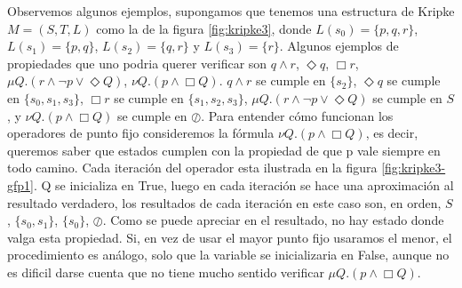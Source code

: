 Observemos algunos ejemplos, supongamos que tenemos una estructura de Kripke $M = (S,T,L)$ como la de la figura \ref{fig:kripke3}, donde $L(s_{0}) = \{p,q,r\}$, $L(s_{1}) = \{p,q\}$, $L(s_{2}) = \{q,r\}$ y $L(s_{3}) = \{r\}$. Algunos ejemplos de propiedades que uno podria querer verificar son $q \land r$, $\Diamond q$, $\Box r$, $\mu Q. (r \land \neg p \lor \Diamond Q)$, $\nu Q. (p \land \Box Q)$. $q \land r$ se cumple en $\{s_{2}\}$, $\Diamond q$ se cumple en $\{s_{0},s_{1},s_{3}\}$, $\Box r$ se cumple en $\{s_{1},s_{2},s_{3}\}$, $\mu Q. (r \land \neg p \lor \Diamond Q)$ se cumple en $S$, y $\nu Q. (p \land \Box Q)$ se cumple en $\oslash$. Para entender cómo funcionan los operadores de punto fijo consideremos la fórmula $\nu Q. (p \land \Box Q)$, es decir, queremos saber que estados cumplen con la propiedad de que p vale siempre en todo camino. Cada iteración del operador esta ilustrada en la figura \ref{fig:kripke3-gfp1}. Q se inicializa en True, luego en cada iteración se hace una aproximación al resultado verdadero, los resultados de cada iteración en este caso son, en orden, $S$, $\{s_{0},s_{1}\}$, $\{s_{0}\}$, $\oslash$. Como se puede apreciar en el resultado, no hay estado donde valga esta propiedad. Si, en vez de usar el mayor punto fijo usaramos el menor, el procedimiento es análogo, solo que la variable se inicializaria en False, aunque no es dificil darse cuenta que no tiene mucho sentido verificar $\mu Q.(p \land \Box Q)$.

